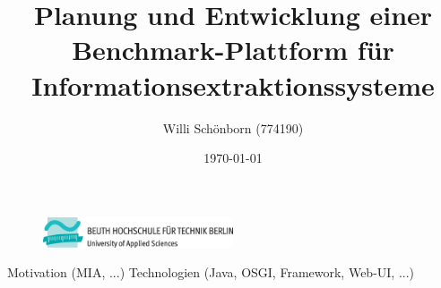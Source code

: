 \documentclass[a4paper,12pt]{article}
\title{Planung und Entwicklung einer Benchmark-Plattform für Informationsextraktionssysteme}
\author{Willi Schönborn (774190)}
\date{\today}
\begin{document}
\begin{figure}[H]
\centering
\includegraphics[width=0.5\textwidth]{beuth.eps}
\maketitle
\end{figure}

\newpage
Motivation (MIA, ...)
Technologien (Java, OSGI, Framework, Web-UI, ...)

\newpage
\nocite{*}
\printbibliography
\end{document}
